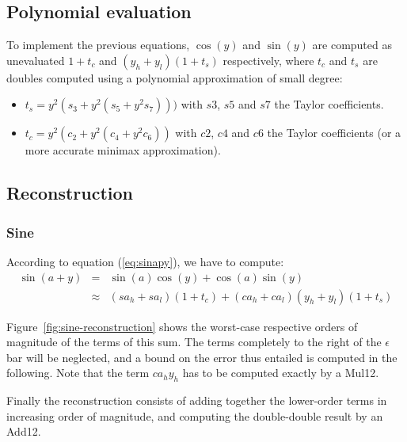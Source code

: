 \subsection{Polynomial evaluation}


To implement the previous equations, $\cos(y)$ and $\sin(y)$ are
computed as unevaluated $1+t_c$ and $(y_h+y_l)(1+t_s)$ respectively,
where $t_c$ and $t_s$ are doubles computed using a polynomial
approximation of small degree:

\begin{itemize}
\item $t_s = y^2(s_3 + y^2(s_5 + y^2s_7)))$ with $s3$, $s5$ and
$s7$ the Taylor coefficients.
\item $t_c = y^2(c_2 + y^2(c_4 + y^2c_6))$ with $c2$, $c4$ and $c6$ the
Taylor coefficients (or a more accurate minimax approximation).
\end{itemize}



\subsection{Reconstruction}

\subsubsection{Sine}
According to equation (\ref{eq:sinapy}), we have to compute: 
 \begin{eqnarray*}
  \sin(a+y) &=& \sin(a) \cos(y)  + \cos(a)\sin(y)  \\
  & \approx& (sa_h+sa_l)(1+t_c) + (ca_h+ca_l)(y_h+y_l)(1+t_s)
\end{eqnarray*}


Figure~\ref{fig:sine-reconstruction} shows the worst-case respective
orders of magnitude of the terms of this sum. The terms completely to the
right of the $\epsilon$ bar will be neglected, and a bound on the
error thus entailed is computed in the following. Note that the term
$ca_hy_h$ has to be computed exactly by a Mul12.

Finally the reconstruction consists of adding together the lower-order
terms in increasing order of magnitude, and computing the
double-double result by an Add12.


